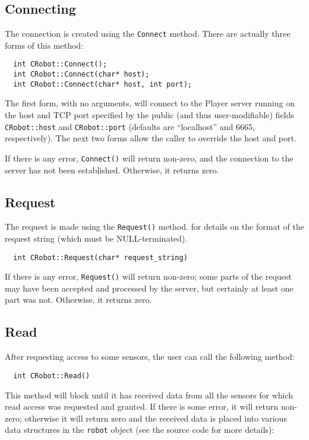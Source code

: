 \documentclass[11pt]{article}
\def\DEFAULTPORT {6665}
\begin{document}
\subsection{Connecting}

The connection is created using
the {\tt Connect} method. There are actually three forms of this
method:

\begin{verbatim}
  int CRobot::Connect();
  int CRobot::Connect(char* host);
  int CRobot::Connect(char* host, int port);
\end{verbatim}

The first form, with no arguments, will connect to the Player server running
on the host and TCP port specified by the public (and thus user-modifiable) 
fields {\tt CRobot::host} and 
{\tt CRobot::port} (defaults are ``localhost'' and \DEFAULTPORT, respectively).  
The next two forms allow the caller to override the host and port.

If there is any error, {\tt Connect()} will return non-zero, and
the connection to the server has not been established.  Otherwise,
it returns zero.


\subsection{Request}

The request is made using the {\tt Request()}
method. 
for details on the format of the request string (which must be
NULL-terminated).
\begin{verbatim}
  int CRobot::Request(char* request_string)
\end{verbatim}

If there is any error, {\tt Request()} will return non-zero;
some parts of the request may have been accepted and processed
by the server, but certainly at
least one part was not.  Otherwise, it returns zero.


\subsection{Read}

After requesting access to some sensors, the user can call the following
method:

\begin{verbatim}
  int CRobot::Read()
\end{verbatim}

This method will block until it has received data from all the sensors
for which read access was requested and granted.  If there
is some error, it will return non-zero; otherwise it will
return zero and the received data is placed
into various data structures in the {\tt robot} object (see the source
code for more details):
\end{document}
